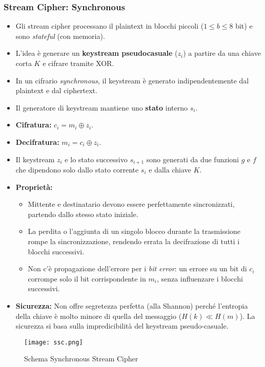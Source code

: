\documentclass[../main.tex]{subfiles}
\begin{document}
\begin{itemize}
	      \subsubsection{Stream Cipher: Synchronous}
	      \begin{itemize}
	      	\item Gli stream cipher processano il plaintext in blocchi piccoli ($1 \le b \le 8$ bit) e sono \emph{stateful} (con memoria).
	      	\item L'idea è generare un \textbf{keystream pseudocasuale} ($z_i$) a partire da una chiave corta $K$ e cifrare tramite XOR.
	      	\item In un cifrario \emph{synchronous}, il keystream è generato indipendentemente dal plaintext e dal ciphertext.
	      	\item Il generatore di keystream mantiene uno \textbf{stato} interno $s_i$.
	      	\item \textbf{Cifratura:} $c_i = m_i \oplus z_i$.
	      	\item \textbf{Decifratura:} $m_i = c_i \oplus z_i$.
	      	\item Il keystream $z_i$ e lo stato successivo $s_{i+1}$ sono generati da due funzioni $g$ e $f$ che dipendono solo dallo stato corrente $s_i$ e dalla chiave $K$.
	      	\item \textbf{Proprietà:}
	      	      \begin{itemize}
	      	      	\item Mittente e destinatario devono essere perfettamente sincronizzati, partendo dallo stesso stato iniziale.
	      	      	\item La perdita o l'aggiunta di un singolo blocco durante la trasmissione rompe la sincronizzazione, rendendo errata la decifrazione di tutti i blocchi successivi.
	      	      	\item Non c'è propagazione dell'errore per i \emph{bit error}: un errore su un bit di $c_i$ corrompe solo il bit corrispondente in $m_i$, senza influenzare i blocchi successivi.
	      	      \end{itemize}
	      	\item \textbf{Sicurezza:} Non offre segretezza perfetta (alla Shannon) perché l'entropia della chiave è molto minore di quella del messaggio ($H(k) \ll H(m)$). La sicurezza si basa sulla impredicibilità del keystream pseudo-casuale.
	      \end{itemize}
	      
	      \begin{figure}[H]
	      	\centering
	      	\texttt{[image: ssc.png]}
	      	\caption{Schema Synchronous Stream Cipher}
	      	\label{fig:etichetta}
	      \end{figure}
	         

\end{itemize}
\end{document}
